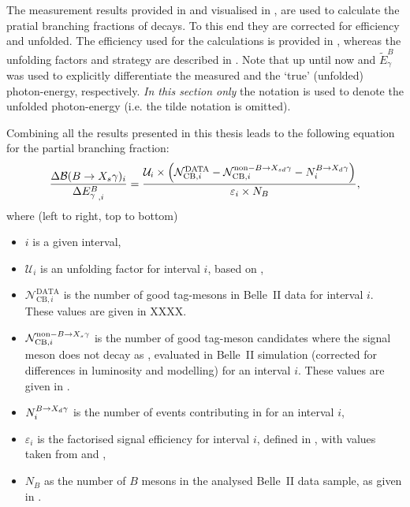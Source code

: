 The measurement results provided in  and visualised in ,
are used to calculate the pratial branching fractions of \BtoXsgamma decays.
To this end they are corrected for efficiency and unfolded.
The efficiency used for the calculations is provided in , 
whereas the unfolding factors and strategy are described in .
Note that up until now \EB and $\tilde{E}_{\gamma}^B$ was used to explicitly differentiate
the measured and the `true' (unfolded) photon-energy, respectively.
\textit{In this section only} the \EB notation is used to denote the unfolded photon-energy (i.e. the tilde notation is omitted).

Combining all the results presented in this thesis leads to the following equation for the partial branching fraction:
\begin{equation}\label{eq:branching_fraction}
    \frac{\Delta\mathcal{B}(\BtoXsgamma)_i}{\Delta {E^B_{\g}}_{,i}} = \frac{\mathcal{U}_i\times\left(\mathcal{N}^{\mathrm{DATA}}_{\mathrm{CB},i} - 
                                                                              \mathcal{N}^{\mathrm{non-}\BtoXsdgamma}_{\mathrm{CB},i} - 
                                                                              N_i^{\BtoXdgamma}\right)}
                                                         {\varepsilon_i \times N_B},
\end{equation}
where (left to right, top to bottom)
\begin{itemize}
    \item $i$ is a given \EB interval,
    \item $\mathcal{U}_i$ is an unfolding factor for interval $i$, based on ,
    \item $\mathcal{N}^{\mathrm{DATA}}_{\mathrm{CB},i}$ is the number of good tag-\B mesons in Belle~II data for interval $i$.
    These values are given in XXXX.
    \item $\mathcal{N}^{\mathrm{non-}\BtoXsgamma}_{\mathrm{CB},i}$ is the number of good tag-\B meson candidates where the signal \B meson does not decay as \BtoXsdgamma, evaluated in Belle~II simulation (corrected for differences in luminosity and modelling) for an interval $i$.
    These values are given in .
    \item $N_i^{\BtoXdgamma}$ is the number of \BtoXdgamma events contributing in for an interval $i$,
    \item $\varepsilon_i$ is the factorised signal efficiency for interval $i$, defined in , 
    with values taken from  and ,
    \item $N_B$ as the number of $B$ mesons in the analysed Belle~II data sample, as given in .
\end{itemize}

